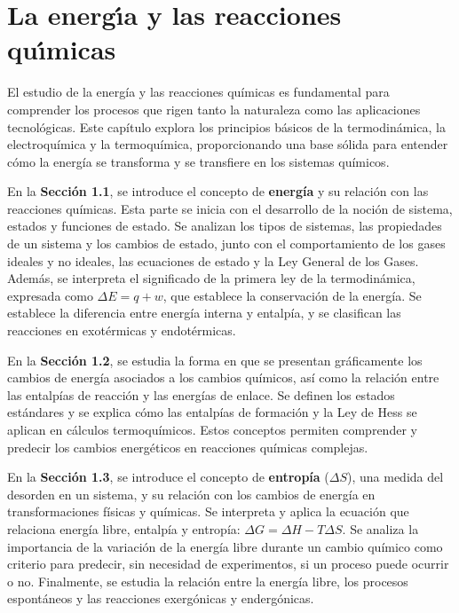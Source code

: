 \chapter[Energia y reacciones]{La energ\'{\i}a y las reacciones qu\'{\i}micas}

El estudio de la energía y las reacciones químicas es fundamental para comprender los procesos que rigen tanto la naturaleza como las aplicaciones tecnológicas. Este capítulo explora los principios básicos de la termodinámica, la electroquímica y la termoquímica, proporcionando una base sólida para entender cómo la energía se transforma y se transfiere en los sistemas químicos.

En la \textbf{Sección 1.1}, se introduce el concepto de \textbf{energía} y su relación con las reacciones químicas. Esta parte se inicia con el desarrollo de la noción de sistema, estados y funciones de estado. Se analizan los tipos de sistemas, las propiedades de un sistema y los cambios de estado, junto con el comportamiento de los gases ideales y no ideales, las ecuaciones de estado y la Ley General de los Gases. Además, se interpreta el significado de la primera ley de la termodinámica, expresada como $\Delta E = q + w$, que establece la conservación de la energía. Se establece la diferencia entre energía interna y entalpía, y se clasifican las reacciones en exotérmicas y endotérmicas.

En la \textbf{Sección 1.2}, se estudia la forma en que se presentan gráficamente los cambios de energía asociados a los cambios químicos, así como la relación entre las entalpías de reacción y las energías de enlace. Se definen los estados estándares y se explica cómo las entalpías de formación y la Ley de Hess se aplican en cálculos termoquímicos. Estos conceptos permiten comprender y predecir los cambios energéticos en reacciones químicas complejas.

En la \textbf{Sección 1.3}, se introduce el concepto de \textbf{entropía} ($\Delta S$), una medida del desorden en un sistema, y su relación con los cambios de energía en transformaciones físicas y químicas. Se interpreta y aplica la ecuación que relaciona energía libre, entalpía y entropía: $\Delta G = \Delta H - T \Delta S$. Se analiza la importancia de la variación de la energía libre durante un cambio químico como criterio para predecir, sin necesidad de experimentos, si un proceso puede ocurrir o no. Finalmente, se estudia la relación entre la energía libre, los procesos espontáneos y las reacciones exergónicas y endergónicas.

